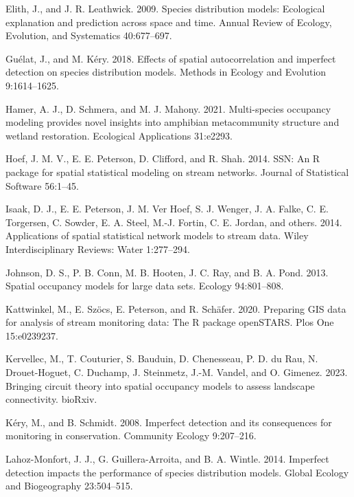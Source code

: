 \documentclass[
  11pt,
  a4paper,
]{article}
\newlength{\cslhangindent}
\newenvironment{CSLReferences}[2] %
 {\begin{list}{}{%
  \setlength{\itemindent}{0pt}
  \setlength{\leftmargin}{0pt}
  \setlength{\parsep}{0pt}
  \ifodd #1
   \setlength{\leftmargin}{\cslhangindent}
   \setlength{\itemindent}{-1\cslhangindent}
  \fi
  \setlength{\itemsep}{#2\baselineskip}}}
 {\end{list}}
\begin{document}
\begin{CSLReferences}{1}{0}
Elith, J., and J. R. Leathwick. 2009. Species distribution models: Ecological explanation and prediction across space and time. Annual Review of Ecology, Evolution, and Systematics 40:677--697.

Guélat, J., and M. Kéry. 2018. Effects of spatial autocorrelation and imperfect detection on species distribution models. Methods in Ecology and Evolution 9:1614--1625.

Hamer, A. J., D. Schmera, and M. J. Mahony. 2021. Multi-species occupancy modeling provides novel insights into amphibian metacommunity structure and wetland restoration. Ecological Applications 31:e2293.

Hoef, J. M. V., E. E. Peterson, D. Clifford, and R. Shah. 2014. {SSN}: An {R} package for spatial statistical modeling on stream networks. Journal of Statistical Software 56:1--45.

Isaak, D. J., E. E. Peterson, J. M. Ver Hoef, S. J. Wenger, J. A. Falke, C. E. Torgersen, C. Sowder, E. A. Steel, M.-J. Fortin, C. E. Jordan, and others. 2014. Applications of spatial statistical network models to stream data. Wiley Interdisciplinary Reviews: Water 1:277--294.

Johnson, D. S., P. B. Conn, M. B. Hooten, J. C. Ray, and B. A. Pond. 2013. Spatial occupancy models for large data sets. Ecology 94:801--808.

Kattwinkel, M., E. Szöcs, E. Peterson, and R. Schäfer. 2020. Preparing GIS data for analysis of stream monitoring data: The {R} package openSTARS. Plos One 15:e0239237.

Kervellec, M., T. Couturier, S. Bauduin, D. Chenesseau, P. D. du Rau, N. Drouet-Hoguet, C. Duchamp, J. Steinmetz, J.-M. Vandel, and O. Gimenez. 2023. Bringing circuit theory into spatial occupancy models to assess landscape connectivity. bioRxiv.

Kéry, M., and B. Schmidt. 2008. Imperfect detection and its consequences for monitoring in conservation. Community Ecology 9:207--216.

Lahoz-Monfort, J. J., G. Guillera-Arroita, and B. A. Wintle. 2014. Imperfect detection impacts the performance of species distribution models. Global Ecology and Biogeography 23:504--515.


\end{CSLReferences}
\end{document}
